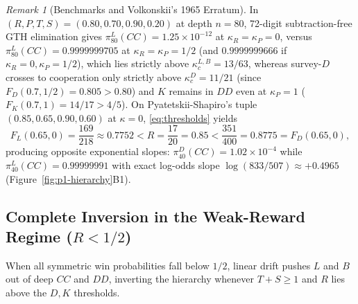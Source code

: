 \documentclass[11pt,reqno]{amsart}
\theoremstyle{definition}
\theoremstyle{remark}
\newtheorem{remark}[theorem]{Remark}
\begin{document}
\begin{remark}[Benchmarks and Volkonskii's 1965 Erratum]
In $(R, P, T, S) = (0.80, 0.70, 0.90, 0.20)$ at depth $n = 80$, 72-digit subtraction-free GTH elimination gives $\pi_{80}^L(CC) = 1.25 \times 10^{-12}$ at $\kappa_R = \kappa_P = 0$, versus $\pi_{80}^L(CC) = 0.9999999705$ at $\kappa_R = \kappa_P = 1/2$ (and $0.9999999666$ if $\kappa_R = 0, \kappa_P = 1/2$), which lies strictly above $\kappa_c^{L,B} = 13/63$, whereas survey-$D$ crosses to cooperation only strictly above $\kappa_c^D = 11/21$ (since $F_D(0.7, 1/2) = 0.805 > 0.80$) and $K$ remains in $DD$ even at $\kappa_P = 1$ ($F_K(0.7, 1) = 14/17 > 4/5$). On Pyatetskii-Shapiro's tuple $(0.85, 0.65, 0.90, 0.60)$ at $\kappa=0$, \eqref{eq:thresholds} yields
\[
  F_L(0.65, 0) = \frac{169}{218} \approx 0.7752 < R = \frac{17}{20} = 0.85 < \frac{351}{400} = 0.8775 = F_D(0.65, 0),
\]
producing opposite exponential slopes: $\pi_{40}^D(CC) = 1.02 \times 10^{-4}$ while $\pi_{40}^L(CC) = 0.99999991$ with exact log-odds slope $\log(833/507) \approx +0.4965$ (Figure~\ref{fig:p1-hierarchy}B1).
\end{remark}

\subsection{Complete Inversion in the Weak-Reward Regime (\texorpdfstring{$R < 1/2$}{R < 1/2})}
When all symmetric win probabilities fall below $1/2$, linear drift pushes $L$ and $B$ out of deep $CC$ and $DD$, inverting the hierarchy whenever $T + S \ge 1$ and $R$ lies above the $D, K$ thresholds.
\end{document}
